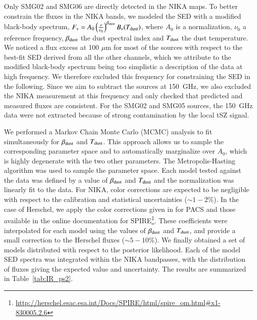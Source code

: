 \documentclass[twocolumn,traditabstract]{aa}
\begin{document}
Only SMG02 and SMG06 are directly detected in the NIKA maps. To better constrain the fluxes in the NIKA bands, we modeled the SED with a modified black-body spectrum, $F_{\nu} = A_0 \left(\frac{\nu}{\nu_0}\right)^{\beta_{\rm dust}} B_{\nu}(T_{\rm dust})$, where $A_0$ is a normalization, $\nu_0$ a reference frequency, $\beta_{\rm dust}$ the dust spectral index and $T_{\rm dust}$ the dust temperature. We noticed a flux excess at 100 $\mu$m for most of the sources with respect to the best-fit SED derived from all the other channels, which we attribute to the modified black-body spectrum being too simplistic a description of the data at high frequency. We therefore excluded this frequency for constraining the SED in the following. Since we aim to subtract the sources at 150~GHz, we also excluded the NIKA measurement at this frequency and only checked that predicted and measured fluxes are consistent. For the SMG02 and SMG05 sources, the 150~GHz data were not extracted because of strong contamination by the local tSZ signal.

We performed a Markov Chain Monte Carlo (MCMC) analysis to fit simultaneously for $\beta_{\rm dust}$ and $T_{\rm dust}$. This approach allows us to sample the corresponding parameter space and to automatically marginalize over $A_0$, which is highly degenerate with the two other parameters. The Metropolis-Hasting algorithm was used to sample the parameter space. Each model tested against the data was defined by a value of $\beta_{\rm dust}$ and $T_{\rm dust}$ and the normalization was linearly fit to the data. For NIKA, color corrections are expected to be negligible with respect to the calibration and statistical uncertainties ($\sim 1-2$\%). In the case of Herschel, we apply the color corrections given in \cite{poglitsch2010} for PACS and those available in the online documentation for SPIRE\footnote{\url{http://herschel.esac.esa.int/Docs/SPIRE/html/spire_om.html\#x1-830005.2.6}}. These coefficients were interpolated for each model using the values of $\beta_{\rm dust}$ and $T_{\rm dust}$, and provide a small correction to the Herschel fluxes ($\sim 5-10$\%). We finally obtained a set of models distributed with respect to the posterior likelihood. Each of the model SED spectra was integrated within the NIKA bandpasses, with the distribution of fluxes giving the expected value and uncertainty. The results are summarized in Table~\ref{tab:IR_ps2}.

\end{document}
